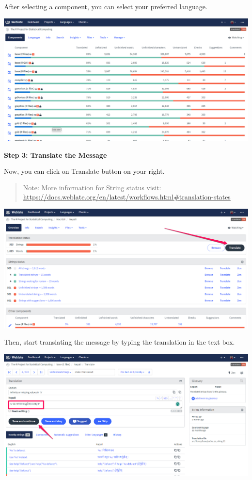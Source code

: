 \documentclass[
]{book}
\begin{document}
After selecting a component, you can select your preferred language.

\includegraphics{img/translate_component.png}

\textbf{Step 3: Translate the Message}

Now, you can click on Translate button on your right.

\begin{quote}
Note: More information for String status visit:
\url{https://docs.weblate.org/en/latest/workflows.html\#translation-states}
\end{quote}

\includegraphics{img/translate_button.png}

Then, start translating the message by typing the translation in the
text box.

\includegraphics{img/translate_string_and_save.png}
\end{document}
